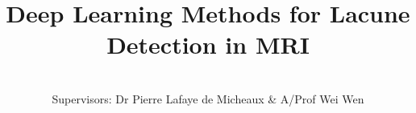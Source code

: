 %
%
% 
%



%
%

% 
%

\title{Deep Learning Methods for Lacune Detection in MRI}


\author{\Authornameonly\\{\bigskip}Supervisors: Dr Pierre Lafaye de Micheaux \& A/Prof Wei Wen}


\copyrightfalse
\figurespagefalse
\tablespagefalse

%
%





\afterpreface

%
%




























